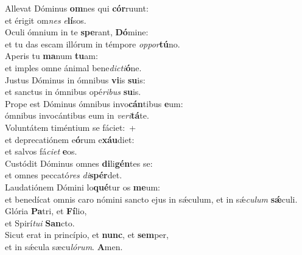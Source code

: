 \evenverse Allevat Dóminus \textbf{om}nes qui \textbf{cór}ruunt:~\*\\
\evenverse et érigit om\textit{nes} \textit{e}\textbf{lí}sos.\\
\oddverse Oculi ómnium in te \textbf{spe}rant, \textbf{Dó}mine:~\*\\
\oddverse et tu das escam illórum in témpore \textit{op}\textit{por}\textbf{tú}no.\\
\evenverse Aperis tu \textbf{ma}num \textbf{tu}am:~\*\\
\evenverse et imples omne ánimal bene\textit{di}\textit{cti}\textbf{ó}ne.\\
\oddverse Justus Dóminus in ómnibus \textbf{vi}is \textbf{su}is:~\*\\
\oddverse et sanctus in ómnibus opé\textit{ri}\textit{bus} \textbf{su}is.\\
\evenverse Prope est Dóminus ómnibus invo\textbf{cán}tibus \textbf{e}um:~\*\\
\evenverse ómnibus invocántibus eum in \textit{ve}\textit{ri}\textbf{tá}te.\\
\oddverse Voluntátem timéntium se fáciet:~+\\
\oddverse  et deprecatiónem e\textbf{ó}rum e\textbf{xáu}diet:~\*\\
\oddverse et salvos fá\textit{ci}\textit{et} \textbf{e}os.\\
\evenverse Custódit Dóminus omnes \textbf{di}li\textbf{gén}tes se:~\*\\
\evenverse et omnes peccató\textit{res} \textit{di}\textbf{spér}det.\\
\oddverse Laudatiónem Dómini lo\textbf{qué}tur os \textbf{me}um:~\*\\
\oddverse et benedícat omnis caro nómini sancto ejus in sǽculum, et in sǽ\textit{cu}\textit{lum} \textbf{sǽ}culi.\\
\evenverse Glória \textbf{Pa}tri, et \textbf{Fí}lio,~\*\\
\evenverse et Spirí\textit{tu}\textit{i} \textbf{San}cto.\\
\oddverse Sicut erat in princípio, et \textbf{nunc}, et \textbf{sem}per,~\*\\
\oddverse et in sǽcula sæcu\textit{ló}\textit{rum}. \textbf{A}men.\\
